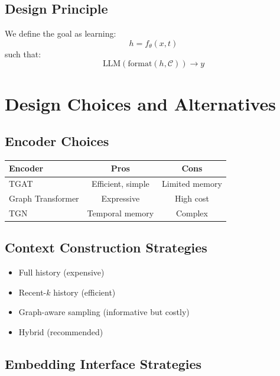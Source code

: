 \documentclass[11pt]{article}
\begin{document}
\subsection{Design Principle}

We define the goal as learning:
\begin{equation}
h = f_\theta(x,t)
\end{equation}
such that:
\begin{equation}
\text{LLM}(\text{format}(h, \mathcal{C})) \rightarrow y
\end{equation}

\section{Design Choices and Alternatives}

\subsection{Encoder Choices}

\begin{center}
\begin{tabular}{lcc}
\toprule
Encoder & Pros & Cons \\
\midrule
TGAT & Efficient, simple & Limited memory \\
Graph Transformer & Expressive & High cost \\
TGN & Temporal memory & Complex \\
\bottomrule
\end{tabular}
\end{center}

\subsection{Context Construction Strategies}

\begin{itemize}
\item Full history (expensive)
\item Recent-$k$ history (efficient)
\item Graph-aware sampling (informative but costly)
\item Hybrid (recommended)
\end{itemize}

\subsection{Embedding Interface Strategies}
\end{document}
